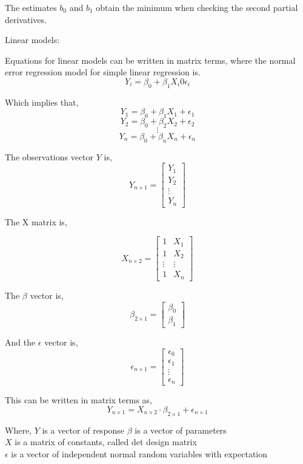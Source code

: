 The estimates $b_0$ and $b_1$ obtain the minimum when checking the second partial derivatives. \newline


Linear models:

Equations for linear models can be written in matrix terms, where the normal error regression model for simple linear regression is.
$$Y_i = \beta_0 + \beta_1 X_i 0 \epsilon_i $$ 


Which implies that,
$$Y_1 = \beta_0 + \beta_1 X_1 + \epsilon_1$$
$$Y_2 = \beta_0 + \beta_2 X_2 + \epsilon_2$$
$$\vdots$$
$$Y_n = \beta_0 + \beta_n X_n + \epsilon_n$$

The observations vector $Y$ is,
$$ Y_{n \times 1} =
\left[
\begin{array}{c}
	Y_1 \\ 
	Y_2 \\ 
	\vdots \\
	Y_n 
\end{array}
\right]
$$	

The X matrix is, 

$$X_{n \times 2}=
\left[
\begin{array}{cc}
	1 & X_1 \\ 
	1 & X_2 \\ 
	\vdots & \vdots \\
	1 & X_n
\end{array}
\right]
$$


The $\beta$ vector is, 
$$ \beta_{2 \times 1} =
\left[
\begin{array}{c}
	\beta_0 \\ 
	\beta_1 
\end{array}
\right]
$$

And the $\epsilon$ vector is,
$$ \epsilon_{n \times 1} =
\left[
\begin{array}{c}
	\epsilon_0 \\ 
	\epsilon_1 \\
	\vdots \\
	\epsilon_n 
\end{array}
\right]
$$

This can be written in matrix terms as, 
$$Y_{n \times 1}=X_{n \times 2} \cdot \beta_{2 \times 1} + \epsilon_{n \times 1}$$	

Where, \newline
\textbf{$Y$} is a vector of response \newline
\textbf{$\beta$} is a vector of parameters \\
\textbf{$X$} is a matrix of constants, called det design matrix\\
\textbf{$\epsilon$} is a vector of independent normal random variables with expectation\\


